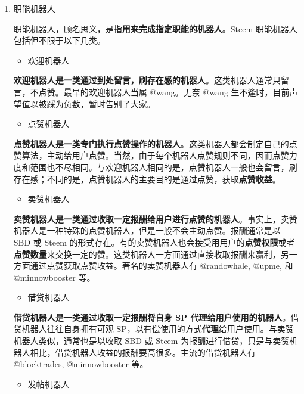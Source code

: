 \documentclass[]{ctexbook}
\providecommand{\tightlist}{%
  \setlength{\itemsep}{0pt}\setlength{\parskip}{0pt}}
\begin{document}
\begin{enumerate}
\def\labelenumi{\arabic{enumi}.}
\item
  职能机器人

  职能机器人，顾名思义，是指\textbf{用来完成指定职能的机器人}。Steem 职能机器人包括但不限于以下几类。

  \begin{itemize}
  \tightlist
  \item
    欢迎机器人
  \end{itemize}

  \textbf{欢迎机器人是一类通过到处留言，刷存在感的机器人}。这类机器人通常只留言，不点赞。最早的欢迎机器人当属 @wang。无奈 @wang 生不逢时，目前声望值以被踩为负数，暂时告别了大家。

  \begin{itemize}
  \tightlist
  \item
    点赞机器人
  \end{itemize}

  \textbf{点赞机器人是一类专门执行点赞操作的机器人}。这类机器人都会制定自己的点赞算法，主动给用户点赞。当然，由于每个机器人点赞规则不同，因而点赞力度和范围也不尽相同。与欢迎机器人相同的是，点赞机器人一般也会留言，刷存在感；不同的是，点赞机器人的主要目的是通过点赞，获取\textbf{点赞收益}。

  \begin{itemize}
  \tightlist
  \item
    卖赞机器人
  \end{itemize}

  \textbf{卖赞机器人是一类通过收取一定报酬给用户进行点赞的机器人}。事实上，卖赞机器人是一种特殊的点赞机器人，但是一般不会主动点赞。报酬通常是以 SBD 或 Steem 的形式存在。有的卖赞机器人也会接受用用户的\textbf{点赞权限}或者\textbf{点赞数量}来交换一定的赞。这类机器人一方面通过直接收取报酬来赢利，另一方面通过点赞获取点赞收益。著名的卖赞机器人有 @randowhale, @upme, 和 @minnowbooster 等。

  \begin{itemize}
  \tightlist
  \item
    借贷机器人
  \end{itemize}

  \textbf{借贷机器人是一类通过收取一定报酬将自身 SP 代理给用户使用的机器人}。借贷机器人往往自身拥有可观 SP，以有偿使用的方式\textbf{代理}给用户使用。与卖赞机器人类似，通常也是以收取 SBD 或 Steem 为报酬进行借贷，只是与卖赞机器人相比，借贷机器人收益的报酬要高很多。主流的借贷机器人有 @blocktrades, @minnowbooster 等。

  \begin{itemize}
  \tightlist
  \item
    发帖机器人
  \end{itemize}


\end{enumerate}
\end{document}
